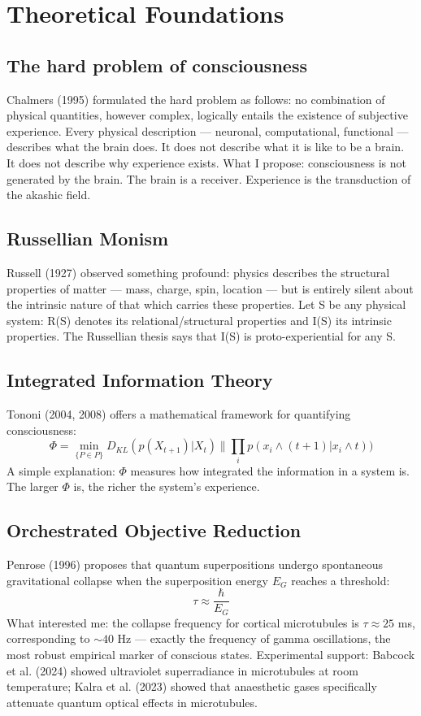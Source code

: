 \section{Theoretical Foundations}
\subsection{The hard problem of consciousness}
Chalmers (1995) formulated the hard problem as follows: no combination of physical quantities, however complex, logically entails the existence of subjective experience. Every physical description --- neuronal, computational, functional --- describes what the brain does. It does not describe what it is like to be a brain. It does not describe why experience exists. What I propose: consciousness is not generated by the brain. The brain is a receiver. Experience is the transduction of the akashic field.

\subsection{Russellian Monism}
Russell (1927) observed something profound: physics describes the structural properties of matter --- mass, charge, spin, location --- but is entirely silent about the intrinsic nature of that which carries these properties. Let S be any physical system: R(S) denotes its relational/structural properties and I(S) its intrinsic properties. The Russellian thesis says that I(S) is proto-experiential for any S.

\subsection{Integrated Information Theory}
Tononi (2004, 2008) offers a mathematical framework for quantifying consciousness:
\begin{equation}
\Phi = \min_{\{P \in P\}} D_{KL}(p(X_{t+1})|X_{t}) \parallel \prod_{i} p(x_{i} \land (t+1)|x_{i} \land t))
\end{equation}
A simple explanation: $\Phi$ measures how integrated the information in a system is. The larger $\Phi$ is, the richer the system's experience.

\subsection{Orchestrated Objective Reduction}
Penrose (1996) proposes that quantum superpositions undergo spontaneous gravitational collapse when the superposition energy $E_G$ reaches a threshold:
\begin{equation}
\tau \approx \frac{\hbar}{E_G}
\end{equation}
What interested me: the collapse frequency for cortical microtubules is $\tau \approx 25$ ms, corresponding to $\sim 40$ Hz --- exactly the frequency of gamma oscillations, the most robust empirical marker of conscious states. Experimental support: Babcock et al. (2024) showed ultraviolet superradiance in microtubules at room temperature; Kalra et al. (2023) showed that anaesthetic gases specifically attenuate quantum optical effects in microtubules.

